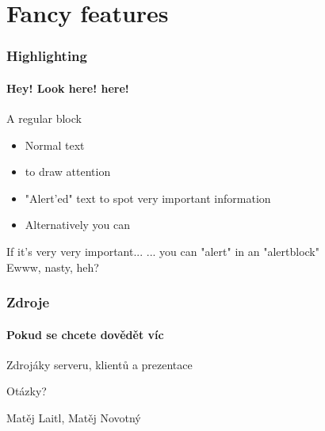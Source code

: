 \documentclass[12pt]{beamer}
\begin{document}
\section{Fancy features}
\begin{frame}
  \frametitle{Highlighting}
  \framesubtitle{Hey! Look here! here!}

  \begin{block}{A regular block}
  \begin{itemize}
    \item Normal text
    \item {} to draw attention
    \item \alert{"Alert'ed" text} to spot very important information
    \item Alternatively you can
  \end{itemize}
  \end{block}
  \begin{alertblock}{If it's very very important...}
  \alert{... you can "alert" in an "alertblock"}\\
  Ewww, nasty, heh?
  \end{alertblock}
\end{frame}


\begin{frame}
  \frametitle{Zdroje}
  \framesubtitle{Pokud se chcete dovědět víc}
  \begin{thebibliography}{10}

  \beamertemplatearticlebibitems

    Zdrojáky serveru, klientů a prezentace

  \end{thebibliography}
\end{frame}

\begin{frame}
  \vspace{2cm}
  {\huge Otázky?}

  \vspace{3cm}
  \begin{flushright}
    Matěj Laitl, Matěj Novotný

  \end{flushright}
\end{frame}
\end{document}
